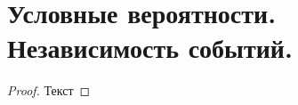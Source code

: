 
\section{Условные вероятности. Независимость событий.}



\begin{proof}
  Текст
\end{proof}


\begin{example}[4]
\end{example}
